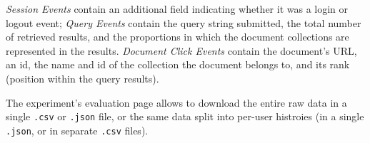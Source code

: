 \documentclass[a4paper]{usiinfbachelorproject}
\begin{document}
\begin{appendices}
        \emph{Session Events} contain an additional field indicating whether it was a login or logout event; 
        \emph{Query Events} contain the query string submitted, the total number of retrieved results, and the proportions
        in which the document collections are represented in the results.
        \emph{Document Click Events} contain the document's URL, an id, the name and id of the collection the document belongs to,
        and its rank (position within the query results). 

        The experiment's evaluation page allows to download the entire raw data in a single \texttt{.csv} or \texttt{.json} file, 
        or the same data split into per-user histroies (in a single \texttt{.json}, or in separate \texttt{.csv} files).



        \end{appendices}


\newpage
	


\end{document}
